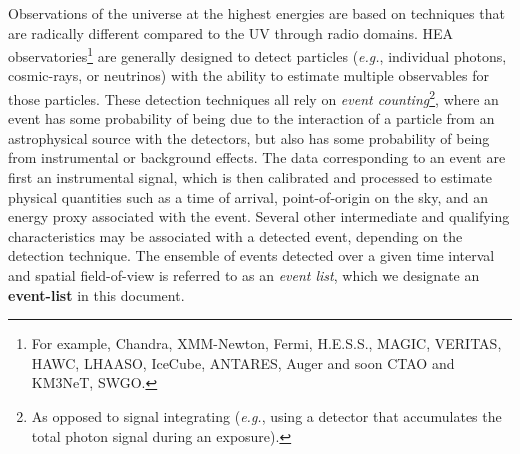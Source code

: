 \documentclass[11pt,a4paper]{ivoa}
\begin{document}
Observations of the universe at the highest energies are based on techniques that are radically different compared to the UV through radio domains. \gls{HEA} observatories\footnote{For example, Chandra, XMM-Newton, Fermi, H.E.S.S., MAGIC, VERITAS, HAWC, LHAASO, IceCube, ANTARES, Auger and soon CTAO and KM3NeT, SWGO.} are generally designed to detect particles ({\em e.g.\/}, individual photons, cosmic-rays, or neutrinos) with the ability to estimate multiple observables for those particles. These detection techniques all rely on {\em event counting\/}\footnote{As opposed to signal integrating ({\em e.g.\/}, using a detector that accumulates the total photon signal during an exposure).}, where an event has some probability of being due to the interaction of a particle from an astrophysical source with the detectors, but also has some probability of being from instrumental or background effects. The data corresponding to an event are first an instrumental signal, which is then calibrated and processed to estimate physical quantities such as a time of arrival, point-of-origin on the sky, and an energy proxy associated with the event. Several other intermediate and qualifying characteristics may be associated with a detected event, depending on the detection technique. The ensemble of events detected over a given time interval and spatial field-of-view is referred to as an {\em event list\/}, which we designate an {\bf event-list} in this document.
\end{document}
